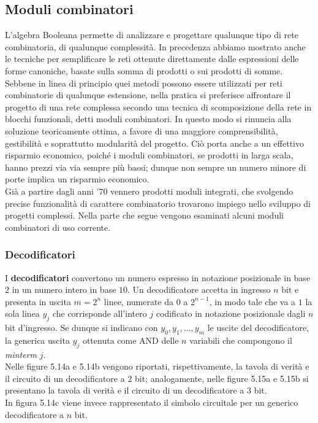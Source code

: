 \documentclass[a4paper]{extarticle}
\begin{document}
\subsection{Moduli combinatori}
L’algebra Booleana permette di analizzare e progettare qualunque tipo di rete combinatoria, di qualunque complessità. In precedenza abbiamo mostrato anche le tecniche per semplificare le reti ottenute direttamente dalle espressioni delle forme canoniche, basate sulla somma di prodotti o sui prodotti di somme. Sebbene in linea di principio quei metodi possono essere utilizzati per reti combinatorie di qualunque estensione, nella pratica si preferisce affrontare il progetto di una rete complessa secondo una tecnica di scomposizione della rete in blocchi funzionali, detti moduli combinatori. In questo modo si rinuncia alla soluzione teoricamente ottima, a favore di una maggiore comprensibilità, gestibilità e soprattutto modularità del progetto. Ciò porta anche a un effettivo risparmio economico, poiché i moduli combinatori, se prodotti in larga scala, hanno prezzi via via sempre più bassi; dunque non sempre un numero minore di porte implica un risparmio economico.\\
Già a partire dagli anni \(’70\) vennero prodotti moduli integrati, che svolgendo precise funzionalità di carattere combinatorio trovarono impiego nello sviluppo di progetti complessi. Nella parte che segue vengono esaminati alcuni moduli combinatori di uso corrente.

\subsubsection{Decodificatori}
I \textbf{decodificatori} convertono un numero espresso in notazione posizionale in base \(2\) in un numero intero in base \(10\). Un decodificatore accetta in ingresso \(n\) bit e presenta in uscita \(m = 2^n\) linee, numerate da \(0\) a \(2^{n - 1}\), in modo tale che va a \(1\) la sola linea \(y_j\) che corrisponde all’intero \(j\) codificato in notazione posizionale dagli \(n\) bit d’ingresso. Se dunque si indicano con \(y_0, y_1, ..., y_m\) le uscite del decodificatore, la generica uscita \(y_j\) ottenuta come AND delle \(n\) variabili che compongono il \textit{minterm} \(j\).\\
Nelle figure 5.14a e 5.14b vengono riportati, rispettivamente, la tavola di verità e il circuito di un decodificatore a \(2\) bit; analogamente, nelle figure 5.15a e 5.15b si presentano la tavola di verità e il circuito di un decodificatore a \(3\) bit.\\
In figura 5.14c viene invece rappresentato il simbolo circuitale per un generico decodificatore a \(n\) bit.
\end{document}
